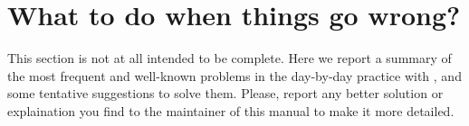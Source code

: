
\thispagestyle{empty}
\section{What to do when things go wrong?}
\label{sec:troubleshoot}
%
This section is not at all intended to be complete. Here we report a summary of the
most frequent and well-known problems in the day-by-day practice with \WANT,
and some tentative suggestions to solve them. 
Please, report any better solution or explaination you find to the maintainer of this
manual to make it more detailed.

